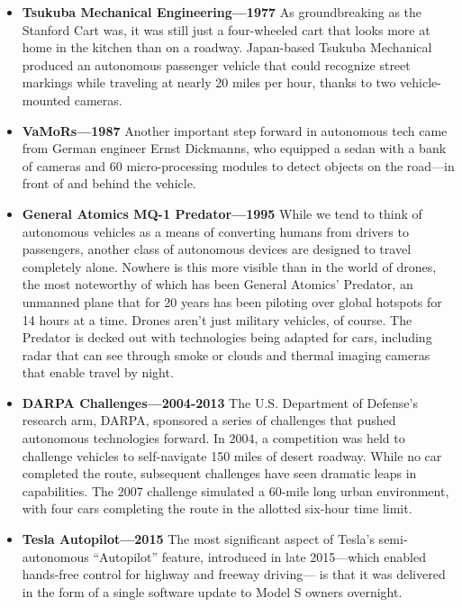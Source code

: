 \begin{itemize}
\par
\item \textbf{Tsukuba Mechanical Engineering—1977 } As groundbreaking as the Stanford Cart was, it was still just a four-wheeled cart that looks more at home in the kitchen than on a roadway. Japan-based Tsukuba Mechanical produced an autonomous passenger vehicle that could recognize street markings while traveling at nearly 20 miles per hour, thanks to two vehicle-mounted cameras.

\par
\item \textbf{VaMoRs—1987} Another important step forward in autonomous tech came from German engineer Ernst Dickmanns, who equipped a sedan with a bank of cameras and 60 micro-processing modules to detect objects on the road—in front of and behind the vehicle.

\par
\item \textbf{General Atomics MQ-1 Predator—1995}  While we tend to think of autonomous vehicles as a means of converting humans from drivers to passengers, another class of autonomous devices are designed to travel completely alone. Nowhere is this more visible than in the world of drones, the most noteworthy of which has been General Atomics’ Predator, an unmanned plane that for 20 years has been piloting over global hotspots for 14 hours at a time. Drones aren’t just military vehicles, of course. The Predator is decked out with technologies being adapted for cars, including radar that can see through smoke or clouds and thermal imaging cameras that enable travel by night.

\par
\item \textbf{DARPA Challenges—2004-2013}  The U.S. Department of Defense’s research arm, DARPA, sponsored a series of challenges that pushed autonomous technologies forward. In 2004, a competition was held to challenge vehicles to self-navigate 150 miles of desert roadway. While no car completed the route, subsequent challenges have seen dramatic leaps in capabilities. The 2007 challenge simulated a 60-mile long urban environment, with four cars completing the route in the allotted six-hour time limit.

\par
\item \textbf{Tesla Autopilot—2015} The most significant aspect of Tesla’s semi-autonomous “Autopilot” feature, introduced in late 2015—which enabled hands-free control for highway and freeway driving— is that it was delivered in the form of a single software update to Model S owners overnight.\cite{web028}
\end{itemize}

